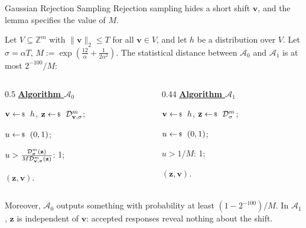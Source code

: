 \documentclass{zkdl-presentation-template}
\begin{document}
    \begin{frame}{Gaussian Rejection Sampling}
        Rejection sampling hides a short shift $\mathbf{v}$, and the lemma specifies the value of $M$.
        \begin{lemma}
            \small
            Let $V \subseteq \mathbb{Z}^m$ with $\|\mathbf{v}\|_2 \leq T$ for all $\mathbf{v} \in V$, and let $h$ be a distribution over $V$. Let $\sigma = \alpha T$, $M := \exp\left(\frac{12}{\alpha} + \frac{1}{2\alpha^2}\right)$. The statistical distance between $\mathcal{A}_0$ and $\mathcal{A}_1$ is at most $2^{-100}/M$:

            \vspace{3pt}
            \begin{columns}[T]
                \begin{column}{0.5\textwidth}
                    \underline{\textbf{Algorithm $\mathcal{A}_0$}}
                    \begin{algoen}
                        \item $\mathbf{v} \leftarrowS h$, $\mathbf{z} \leftarrowS \dgaussian^m_{\mathbf{v},\sigma}$;
                        \item $u \leftarrowS (0,1)$;
                        \item {} $u > \frac{\mathcal{D}^m_{\sigma}(\mathbf{z})}{M\mathcal{D}^m_{\mathbf{v},\sigma}(\mathbf{z})}$:  1;
                        \item {} $(\mathbf{z}, \mathbf{v})$.
                    \end{algoen}
                \end{column}
                \begin{column}{0.44\textwidth}
                    \underline{\textbf{Algorithm $\mathcal{A}_1$}}
                    \begin{algoen}
                        \item $\mathbf{v} \leftarrowS h$, $\mathbf{z} \leftarrowS \dgaussian^m_{\sigma}$;
                        \item $u \leftarrowS (0,1)$;
                        \item {} $u > 1/M$:  1;
                        \item {} $(\mathbf{z}, \mathbf{v})$.
                    \end{algoen}
                \end{column}
            \end{columns}
        \end{lemma}
        \pause
        Moreover, $\mathcal{A}_0$ outputs something with probability at least $(1-2^{-100})/M$. In $\mathcal{A}_1$, $\mathbf{z}$ is independent of $\mathbf{v}$: accepted responses reveal nothing about the shift.
    \end{frame}
\end{document}
